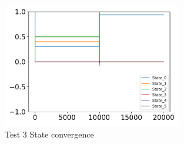 \begin{figure}[htbp]\centerline{\includegraphics[width=0.7\textwidth, keepaspectratio]{AutoTeX/Test31}}\caption{Test 3 State convergence}\label{fig:Test31}\end{figure}